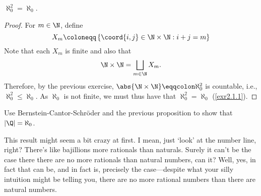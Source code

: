 \begin{prp}{}{}
	$\aleph _0^2=\aleph _0$.
	\begin{proof}
		For $m\in \N$, define
		\begin{equation}
		X_m\coloneqq \left\{ \coord{i,j}\in \N \times \N:i+j=m\right\} 
		\end{equation}
		Note that each $X_m$ is finite and also that
		\begin{equation}
		\N \times \N =\bigsqcup _{m\in \N}X_m.
		\end{equation}
		Therefore, by the previous exercise, $\abs{\N \times \N }\eqqcolon \aleph _0^2$ is countable, i.e., $\aleph _0^2\leq \aleph _0$.  As $\aleph _0$ is not finite, we must thus have that $\aleph _0^2=\aleph _0$ (\cref{exr2.1.1}).
	\end{proof}
\end{prp}
\begin{exr}{}{}
	Use Bernstein-Cantor-Schröder and the previous proposition to show that $|\Q |=\aleph _0$.
\end{exr}
This result might seem a bit crazy at first.  I mean, just `look' at the number line, right?  There's like bajillions more rationals than naturals.  Surely it can't be the case there there are no more rationals than natural numbers, can it?  Well, yes, in fact that can be, and in fact is, precisely the case---despite what your silly intuition might be telling you, there are no more rational numbers than there are natural numbers.

